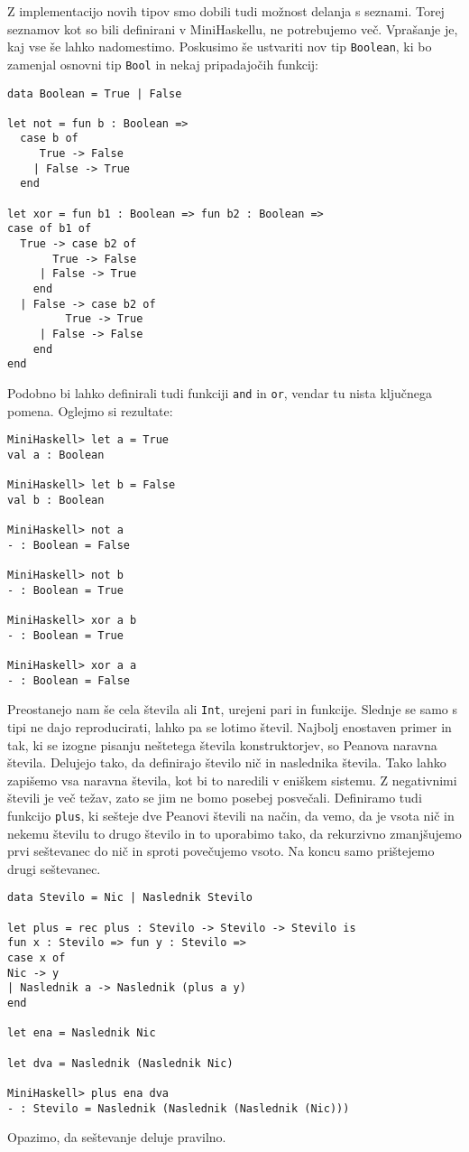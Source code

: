 \documentclass[12pt,a4paper,openany]{book}
\begin{document}
Z implementacijo novih tipov smo dobili tudi možnost delanja s seznami. Torej seznamov kot so bili definirani v MiniHaskellu, ne potrebujemo več. Vprašanje je, kaj vse še lahko nadomestimo.
Poskusimo še ustvariti nov tip \lstinline{Boolean}, ki bo zamenjal osnovni tip \lstinline{Bool} in nekaj pripadajočih funkcij:
\begin{lstlisting}
data Boolean = True | False
	
let not = fun b : Boolean => 
  case b of 
     True -> False 
    | False -> True 
  end

let xor = fun b1 : Boolean => fun b2 : Boolean =>
case of b1 of
  True -> case b2 of
	   True -> False
	 | False -> True
	end
  | False -> case b2 of
		 True -> True
	 | False -> False
	end
end
\end{lstlisting}
Podobno bi lahko definirali tudi funkciji \lstinline{and} in \lstinline{or}, vendar tu nista ključnega pomena. Oglejmo si rezultate:
\begin{lstlisting}
MiniHaskell> let a = True
val a : Boolean

MiniHaskell> let b = False
val b : Boolean

MiniHaskell> not a
- : Boolean = False

MiniHaskell> not b
- : Boolean = True

MiniHaskell> xor a b
- : Boolean = True

MiniHaskell> xor a a
- : Boolean = False
\end{lstlisting}
Preostanejo nam še cela števila ali \lstinline{Int}, urejeni pari in funkcije. Slednje se samo s tipi ne dajo reproducirati, lahko pa se lotimo števil. Najbolj enostaven primer in tak, ki se izogne pisanju neštetega števila 
konstruktorjev, so Peanova naravna števila. Delujejo tako, da definirajo število nič in naslednika števila. Tako lahko zapišemo vsa naravna števila, kot bi to naredili v eniškem sistemu. Z negativnimi števili je več težav, 
zato se jim ne bomo posebej posvečali. Definiramo tudi funkcijo \lstinline{plus}, ki sešteje dve Peanovi števili na način, da vemo, da je vsota nič in nekemu številu to drugo število in to uporabimo tako, da rekurzivno 
zmanjšujemo prvi seštevanec do nič in sproti povečujemo vsoto. Na koncu samo prištejemo drugi seštevanec.
\begin{lstlisting}
data Stevilo = Nic | Naslednik Stevilo

let plus = rec plus : Stevilo -> Stevilo -> Stevilo is
fun x : Stevilo => fun y : Stevilo =>
case x of
Nic -> y
| Naslednik a -> Naslednik (plus a y)
end

let ena = Naslednik Nic

let dva = Naslednik (Naslednik Nic)

MiniHaskell> plus ena dva
- : Stevilo = Naslednik (Naslednik (Naslednik (Nic)))
\end{lstlisting}
Opazimo, da seštevanje deluje pravilno. 
\end{document}
